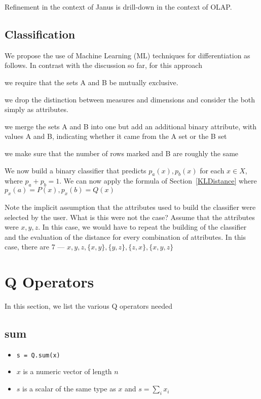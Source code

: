 Refinement in the context of Janus is drill-down in the context of OLAP. 


\TBC

\subsection{Classification}
\label{Classification}

We propose the use of Machine Learning (ML) techniques for differentiation as
follows. 
In contrast with the discussion so far, for this approach
\be
\item we require that the sets A and B be mutually exclusive.
\item we drop the distinction between measures and dimensions and
consider the both simply as attributes.
\item we merge the sets A and B into one but add an additional 
binary attribute, with values A and B, indicating whether it came from the A set
or the B set
\item we make sure that the number of rows marked and B are roughly the same
\ee

We now build a binary classifier that predicts \(p_a(x), p_b(x)\) for each \(x \in
X\), where \(p_a + p_b = 1\). We can now apply the formula of
Section~\ref{KLDistance} where \(p_x(a) = P(x), p_x(b) = Q(x)\)

Note the implicit assumption that the attributes used to build 
the classifier were selected by the user. What is this were not the case? Assume
that the attributes were \(x, y, z\). In this case, we would have to repeat the
building of the classifier and the evaluation of the distance for every
combination of attributes. In this case, there are 7 
--- \(x, y, z, \{x, y\}, \{y, z\}, \{z, x\}, \{x, y, z\}\)


\section{Q Operators}

In this section, we list the various Q operators needed

\subsection{sum}
\label{sum}

\begin{itemize}
\item \verb+s = Q.sum(x)+ 
\item \(x\) is a numeric vector of length \(n\)
\item \(s\) is a scalar of the same type as \(x\) and \(s = \sum_i x_i\)
\end{itemize}

